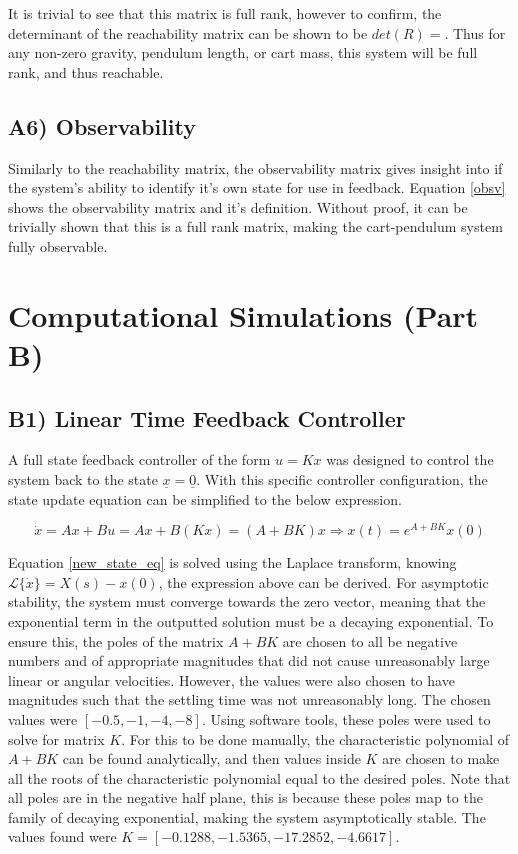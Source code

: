 \documentclass{article}
\begin{document}


It is trivial to see that this matrix is full rank, however to confirm, the determinant of the reachability matrix can be shown to be $det(R)=$. Thus for any non-zero gravity, pendulum length, or cart mass, this system will be full rank, and thus reachable.

\subsection*{A6) Observability}
Similarly to the reachability matrix, the observability matrix gives insight into if the system's ability to identify it's own state for use in feedback. Equation \ref{obsv} shows the observability matrix and it's definition. Without proof, it can be trivially shown that this is a full rank matrix, making the cart-pendulum system fully observable.



\section{Computational Simulations (Part B)}


\subsection*{B1) Linear Time Feedback Controller}
A full state feedback controller of the form $u=Kx$ was designed to control the system back to the state $\underline{x}=\underline{0}$. With this specific controller configuration, the state update equation can be simplified to the below expression.

\begin{equation}\label{new_state_eq}
    \dot x = Ax+Bu = Ax+B(Kx) = (A+BK)x   \Rightarrow   x(t)=e^{A+BK}x(0)
\end{equation}
\newline

Equation \ref{new_state_eq} is solved using the Laplace transform, knowing $\mathcal{L}\{\dot x\}=X(s)-x(0)$, the expression above can be derived. For asymptotic stability, the system must converge towards the zero vector, meaning that the exponential term in the outputted solution must be a decaying exponential. To ensure this, the poles of the matrix $A+BK$ are chosen to all be negative numbers and of appropriate magnitudes that did not cause unreasonably large linear or angular velocities. However, the values were also chosen to have magnitudes such that the settling time was not unreasonably long. The chosen values were $[-0.5,-1,-4,-8]$. Using software tools, these poles were used to solve for matrix $K$. For this to be done manually, the characteristic polynomial of $A+BK$ can be found analytically, and then values inside $K$ are chosen to make all the roots of the characteristic polynomial equal to the desired poles. Note that all poles are in the negative half plane, this is because these poles map to the family of decaying exponential, making the system asymptotically stable. The values found were $K=[-0.1288,-1.5365,-17.2852,-4.6617]$.
\newline
\end{document}
